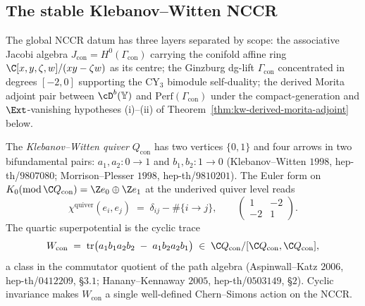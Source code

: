 \subsection{The stable Klebanov--Witten NCCR}
\label{subsec:stable-kw-nccr}

The global NCCR datum has three layers separated by scope: the associative Jacobi algebra $J_{\mathrm{con}} = H^0(\Gamma_{\mathrm{con}})$ carrying the conifold affine ring $\C[x,y,\zeta,w]/(xy - \zeta w)$ as its centre; the Ginzburg dg-lift $\Gamma_{\mathrm{con}}$ concentrated in degrees $[-2, 0]$ supporting the $\mathrm{CY}_3$ bimodule self-duality; the derived Morita adjoint pair between $\cD^b(\bY)$ and $\mathrm{Perf}(\Gamma_{\mathrm{con}})$ under the compact-generation and $\Ext$-vanishing hypotheses (i)--(ii) of Theorem~\ref{thm:kw-derived-morita-adjoint} below.

\begin{definition}
\label{def:kw-quiver-superpotential}
The \emph{Klebanov--Witten quiver} $Q_{\mathrm{con}}$ has two vertices $\{0, 1\}$ and four arrows in two bifundamental pairs: $a_1, a_2 : 0 \to 1$ and $b_1, b_2 : 1 \to 0$ (Klebanov--Witten $1998$, hep-th/$9807080$; Morrison--Plesser $1998$, hep-th/$9810201$). The Euler form on $K_0(\mathrm{mod}\,\C Q_{\mathrm{con}}) = \Z e_0 \oplus \Z e_1$ at the underived quiver level reads
\[
 \chi^{\mathrm{quiver}}(e_i, e_j) \;=\; \delta_{ij} - \#\{i \to j\}, \qquad \begin{pmatrix} 1 & -2 \\ -2 & 1 \end{pmatrix}.
\]
The quartic superpotential is the cyclic trace
\[
 W_{\mathrm{con}} \;=\; \mathrm{tr}\bigl(a_1 b_1 a_2 b_2 \;-\; a_1 b_2 a_2 b_1\bigr) \;\in\; \C Q_{\mathrm{con}} / [\C Q_{\mathrm{con}}, \C Q_{\mathrm{con}}],
\]
a class in the commutator quotient of the path algebra (Aspinwall--Katz $2006$, hep-th/$0412209$, §$3.1$; Hanany--Kennaway $2005$, hep-th/$0503149$, §$2$). Cyclic invariance makes $W_{\mathrm{con}}$ a single well-defined Chern--Simons action on the NCCR.
\end{definition}

